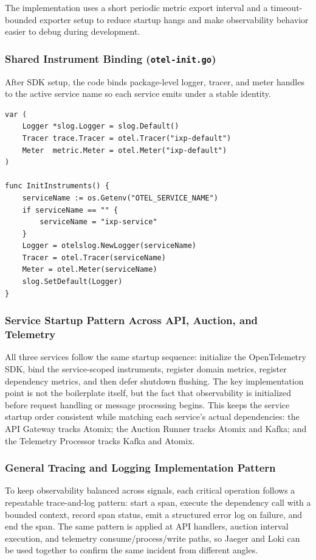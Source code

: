 The implementation uses a short periodic metric export interval and a timeout-bounded exporter setup to reduce startup hangs and make observability behavior easier to debug during development.

\subsubsection{Shared Instrument Binding (\texttt{otel-init.go})}

After SDK setup, the code binds package-level logger, tracer, and meter handles to the active service name so each service emits under a stable identity.

\begin{verbatim}
var (
    Logger *slog.Logger = slog.Default()
    Tracer trace.Tracer = otel.Tracer("ixp-default")
    Meter  metric.Meter = otel.Meter("ixp-default")
)

func InitInstruments() {
    serviceName := os.Getenv("OTEL_SERVICE_NAME")
    if serviceName == "" {
        serviceName = "ixp-service"
    }
    Logger = otelslog.NewLogger(serviceName)
    Tracer = otel.Tracer(serviceName)
    Meter = otel.Meter(serviceName)
    slog.SetDefault(Logger)
}
\end{verbatim}

\subsubsection{Service Startup Pattern Across API, Auction, and Telemetry}

All three services follow the same startup sequence: initialize the OpenTelemetry SDK, bind the service-scoped instruments, register domain metrics, register dependency metrics, and then defer shutdown flushing. The key implementation point is not the boilerplate itself, but the fact that observability is initialized before request handling or message processing begins. This keeps the service startup order consistent while matching each service's actual dependencies: the API Gateway tracks Atomix; the Auction Runner tracks Atomix and Kafka; and the Telemetry Processor tracks Kafka and Atomix.

\subsubsection{General Tracing and Logging Implementation Pattern}

To keep observability balanced across signals, each critical operation follows a repeatable trace-and-log pattern: start a span, execute the dependency call with a bounded context, record span status, emit a structured error log on failure, and end the span. The same pattern is applied at API handlers, auction interval execution, and telemetry consume/process/write paths, so Jaeger and Loki can be used together to confirm the same incident from different angles.

